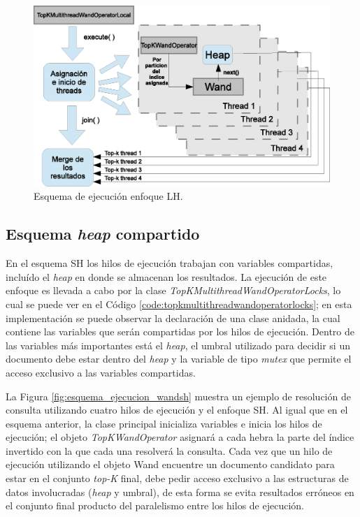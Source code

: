 \begin{figure}[tp]
\centering
\includegraphics[scale=.75]{images/ejecucion_topkmultithreadwandopLOCAL.eps}
\caption{Esquema de ejecución enfoque LH.}
\label{fig:esquema_ejecucion_wandlh}
\end{figure}

\subsection{Esquema \textit{heap} compartido}
\label{evaluacionexperimental:esquemash}
En el esquema SH los hilos de ejecución trabajan con variables compartidas, incluído el \textit{heap} en donde se almacenan los resultados. La ejecución de este enfoque es llevada a cabo por la clase \textit{TopKMultithreadWandOperatorLocks}, lo cual se puede ver en el Código \ref{code:topkmultithreadwandoperatorlocks}; en esta implementación se puede observar la declaración de una clase anidada, la cual contiene las variables que serán compartidas por los hilos de ejecución. Dentro de las variables más importantes está el \textit{heap}, el umbral utilizado para decidir si un documento debe estar dentro del \textit{heap} y la variable de tipo \textit{mutex} que permite el acceso exclusivo a las variables compartidas. 



La Figura \ref{fig:esquema_ejecucion_wandsh} muestra un ejemplo de resolución de consulta utilizando cuatro hilos de ejecución y el enfoque SH. Al igual que en el esquema anterior, la clase principal inicializa variables e inicia los hilos de ejecución; el objeto \textit{TopKWandOperator} asignará a cada hebra la parte del índice invertido con la que cada una resolverá la consulta. Cada vez que un hilo de ejecución utilizando el objeto Wand encuentre un documento candidato para estar en el conjunto \textit{top-K} final, debe pedir acceso exclusivo a las estructuras de datos involucradas (\textit{heap} y umbral), de esta forma se evita resultados erróneos en el conjunto final producto del paralelismo entre los hilos de ejecución.  

